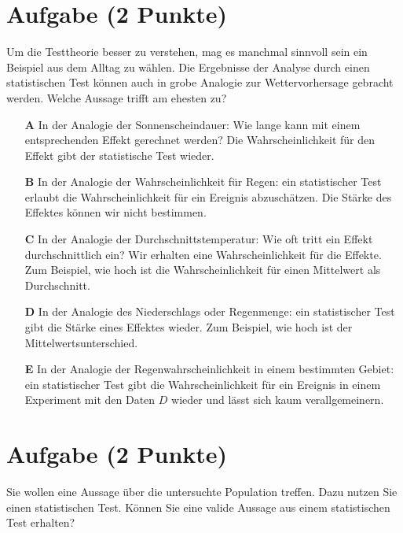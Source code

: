 \documentclass[a4paper, 9pt]{scrartcl}\usepackage[]{graphicx}\usepackage[]{xcolor}
\begin{document}
\section{Aufgabe \hfill (2 Punkte)}



Um die Testtheorie besser zu verstehen, mag es manchmal sinnvoll sein ein Beispiel aus dem Alltag zu wählen. Die Ergebnisse der Analyse durch einen statistischen Test können auch in grobe Analogie zur Wettervorhersage gebracht werden. Welche Aussage trifft am ehesten zu?



\begin{enumerate}
\item [\textbf{A} \msquare] In der Analogie der Sonnenscheindauer: Wie lange kann mit einem entsprechenden Effekt gerechnet werden? Die Wahrscheinlichkeit für den Effekt gibt der statistische Test wieder.
\item [\textbf{B} \msquare] In der Analogie der Wahrscheinlichkeit für Regen: ein statistischer Test erlaubt die Wahrscheinlichkeit für ein Ereignis abzuschätzen. Die Stärke des Effektes können wir nicht bestimmen.
\item [\textbf{C} \msquare] In der Analogie der Durchschnittstemperatur: Wie oft tritt ein Effekt durchschnittlich ein? Wir erhalten eine Wahrscheinlichkeit für die Effekte. Zum Beispiel, wie hoch ist die Wahrscheinlichkeit für einen Mittelwert als Durchschnitt.
\item [\textbf{D} \msquare] In der Analogie des Niederschlags oder Regenmenge: ein statistischer Test gibt die Stärke eines Effektes wieder. Zum Beispiel, wie hoch ist der Mittelwertsunterschied.
\item [\textbf{E} \msquare] In der Analogie der Regenwahrscheinlichkeit in einem bestimmten Gebiet: ein statistischer Test gibt die Wahrscheinlichkeit für ein Ereignis in einem Experiment mit den Daten $D$ wieder und lässt sich kaum verallgemeinern.
\end{enumerate}

\section{Aufgabe \hfill (2 Punkte)}



Sie wollen eine Aussage über die untersuchte Population treffen. Dazu nutzen Sie einen statistischen Test. Können Sie eine valide Aussage aus einem statistischen Test erhalten?
\end{document}
